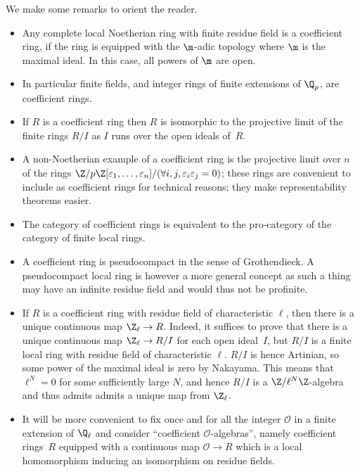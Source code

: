 \begin{remark} We make some remarks to orient the reader.
  \begin{itemize}
    \item Any complete local Noetherian ring with finite residue field is a coefficient ring,
      if the ring is equipped with the $\m$-adic topology where $\m$ is the maximal ideal.
      In this case, all powers of $\m$ are open.
    \item In particular finite fields, and integer rings of finite extensions
      of $\Q_p$, are coefficient rings.
    \item If $R$ is a coefficient ring then $R$ is isomorphic to the projective limit
      of the finite rings $R/I$ as $I$ runs over the open ideals of~$R$.
    \item A non-Noetherian example of a coefficient ring is the projective limit over $n$ of
the rings $\Z/p\Z[\varepsilon_1,\ldots,\varepsilon_n]/(\forall i,j,\varepsilon_i\varepsilon_j=0)$;
these rings are convenient to include as coefficient rings for technical reasons; they make
representability theorems easier.
    \item The category of coefficient rings is equivalent to the pro-category of the
      category of finite local rings.
    \item A coefficient ring is pseudocompact in the sense of Grothendieck. A pseudocompact
      local ring is however a more general concept as such a thing may have an infinite
      residue field and would thus not be profinite.
    \item If $R$ is a coefficient ring with residue field of characteristic $\ell$,
  then there is a unique continuous map $\Z_\ell\to R$. Indeed, it suffices to prove that there
  is a unique continuous map $\Z_\ell\to R/I$ for each
  open ideal~$I$, but $R/I$ is a finite local ring with residue field of characteristic $\ell$.
  $R/I$ is hence Artinian, so some power of the maximal ideal is zero by Nakayama. This means
  that $\ell^N=0$ for some sufficiently large $N$, and hence $R/I$ is a $\Z/\ell^N\Z$-algebra
  and thus admits admits a unique map from $\Z_\ell$.
    \item It will be more convenient to fix once and for all the integer $\mathcal{O}$ in a
  finite extension of $\Q_\ell$ and consider ``coefficient $\mathcal{O}$-algebras'', namely
  coefficient rings~$R$ equipped with a continuous map $\mathcal{O}\to R$ which is a local
  homomorphism inducing an isomorphism on residue fields.
  \end{itemize}
\end{remark}

